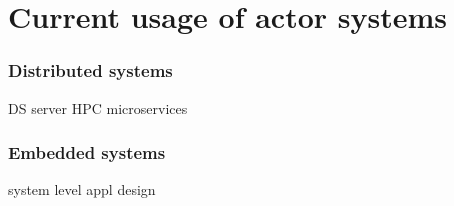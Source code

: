 \section{Current usage of actor systems}
\begin{frame}
\frametitle{Distributed systems}
DS server
HPC
microservices
\end{frame}

\begin{frame}
\frametitle{Embedded systems}
system level
appl design
\end{frame}